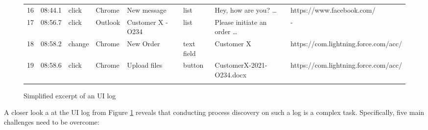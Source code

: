 \begin{figure}[h!]
\begin{adjustbox}{max width=\textwidth}
\begin{tabular}{llllllll}
16&08:44.1&click&Chrome&New message&list&Hey, how are you? …&https://www.facebook.com/\\\noalign{\smallskip}
17&08:56.7&click&Outlook&Customer X - O234&list&Please initiate an order …&-\\\noalign{\smallskip}
18&08:58.2&change&Chrome&New Order&text field&Customer X&https://com.lightning.force.com/acc/\\\noalign{\smallskip}
19&08:58.6&click&Chrome&Upload files&button&CustomerX-2021-O234.docx&https://com.lightning.force.com/acc/\\\noalign{\smallskip}
\hline\noalign{\smallskip}
\end{tabular}
\end{adjustbox}
\caption{Simplified excerpt of an UI log}
\label{fig:example}
\end{figure}

A closer look a at the UI log from Figure \ref{fig:example} reveals that conducting process discovery on such a log is a complex task. Specifically, five main challenges need to be overcome: 

